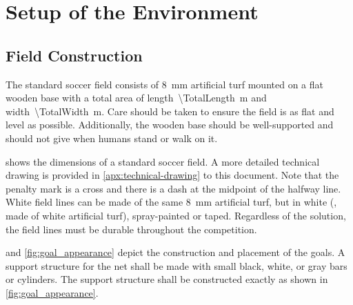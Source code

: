 \section{Setup of the Environment}
\label{sec:setup_environment}

\subsection{Field Construction}
\label{sec:field_dim}

The standard soccer field consists of \qty{8}{\milli\metre} artificial turf mounted on a flat wooden base with a total area of length~\qty{\TotalLength}{\metre} and width~\qty{\TotalWidth}{\metre}.
Care should be taken to ensure the field is as flat and level as possible.
Additionally, the wooden base should be well-supported and should not give when humans stand or walk on it.

 shows the dimensions of a standard soccer field.
A more detailed technical drawing is provided in \cref{apx:technical-drawing} to this document.
Note that the penalty mark is a cross and there is a dash at the midpoint of the halfway line.
White field lines can be made of the same \qty{8}{\milli\metre} artificial turf, but in white (\ie, made of white artificial turf), spray-painted or taped.
Regardless of the solution, the field lines must be durable throughout the competition.

 and \cref{fig:goal_appearance} depict the construction and placement of the goals.
A support structure for the net shall be made with small black, white, or gray bars or cylinders.
The support structure shall be constructed exactly as shown in \cref{fig:goal_appearance}.

